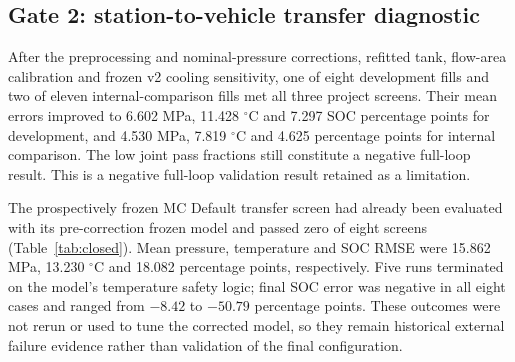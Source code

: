 \documentclass[12pt,a4paper]{article}
\begin{document}
\subsection{Gate 2: station-to-vehicle transfer diagnostic}
After the preprocessing and nominal-pressure corrections, refitted tank, flow-area
calibration and frozen v2 cooling sensitivity, one of eight development fills and
two of eleven internal-comparison fills met all three project screens. Their mean
errors improved to 6.602 MPa, 11.428 $^{\circ}$C and 7.297 SOC percentage points
for development, and 4.530 MPa, 7.819 $^{\circ}$C and 4.625 percentage points for
internal comparison. The low joint pass fractions still constitute a negative
full-loop result. This is a negative full-loop validation result retained as a
limitation.

The prospectively frozen MC Default transfer screen had already been evaluated with its
pre-correction frozen model and passed zero of eight screens
(Table~\ref{tab:closed}). Mean pressure, temperature and SOC RMSE were 15.862 MPa,
13.230 $^{\circ}$C and 18.082 percentage points, respectively. Five runs terminated
on the model's temperature safety logic; final SOC error was negative in all eight
cases and ranged from $-8.42$ to $-50.79$ percentage points. These outcomes were
not rerun or used to tune the corrected model, so they remain historical external
failure evidence rather than validation of the final configuration.

\begin{table}[htbp]
\centering
\caption{Closed-loop performance. The development and already-inspected comparison
sets use the corrected v2 pipeline; the MC Default set reports its prospectively
frozen historical model and was not reused after correction.}
\label{tab:closed}
\small
{}
\end{table}
\end{document}
